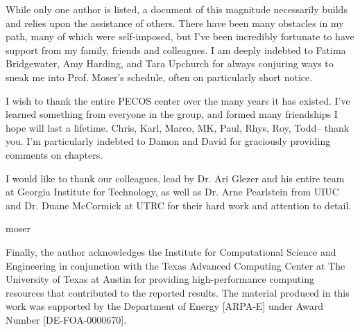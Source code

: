 %

While only one author is listed, a document of this magnitude
necessarily builds and relies upon the assistance of others. There have
been many obstacles in my path, many of which were self-imposed, but
I've been incredibly fortunate to have support from my family, friends
and colleagues. 
%
%
I am deeply indebted to Fatima Bridgewater, Amy Harding, and Tara
Upchurch for always conjuring ways to sneak me into Prof. Moser's
schedule, often on particularly short notice. 

%
%
I wish to thank the entire PECOS center over the many years it has
existed. I've learned something from everyone in the group, and formed
many friendships I hope will last a lifetime. Chris, Karl, Marco, MK,
Paul, Rhys, Roy, Todd-- thank you. I'm particularly indebted to Damon and
David for graciously providing comments on chapters.   


%
%
I would like to thank our colleagues, lead by Dr\@. Ari Glezer and his 
entire team at Georgia Institute for Technology, as well as Dr\@. Arne
Pearlstein from UIUC and Dr\@. Duane McCormick at UTRC for their hard
work and attention to detail. 

%
%
moser


%
%
%


Finally, the author acknowledges the Institute for Computational Science
and Engineering in conjunction with the Texas Advanced Computing Center
at The University of Texas at Austin for providing high-performance
computing resources that contributed to the reported results.
The material produced in this work was supported by the Department of
Energy [ARPA-E] under Award Number [DE-FOA-0000670].


